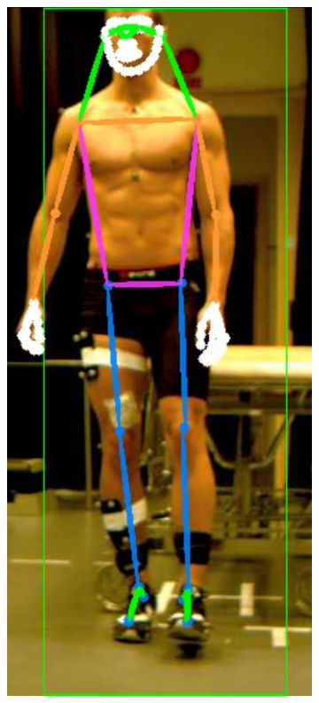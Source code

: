 {\begin{figure}[h]
  ~
  \begin{subfigure}[t]{0.22\textwidth}
    \centering
    \includegraphics[height=1.3\textwidth]{files/figs/res/hpe/36-2.png}
    \caption{}
  \end{subfigure}
  ~
  \begin{subfigure}[t]{0.22\textwidth}
    \centering

\end{subfigure}
\end{figure}}
